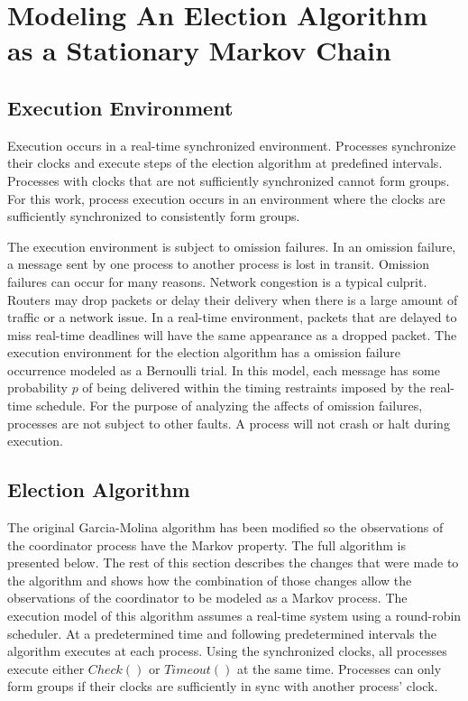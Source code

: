 \section{Modeling An Election Algorithm as a Stationary Markov Chain}



\subsection{Execution Environment}

Execution occurs in a real-time synchronized environment.
Processes synchronize their clocks and execute steps of the election algorithm at predefined intervals.
Processes with clocks that are not sufficiently synchronized cannot form groups.
For this work, process execution occurs in an environment where the clocks are sufficiently synchronized to consistently form groups.

The execution environment is subject to omission failures.
In an omission failure, a message sent by one process to another process is lost in transit.
Omission failures can occur for many reasons.
Network congestion is a typical culprit.
Routers may drop packets or delay their delivery when there is a large amount of traffic or a network issue.
In a real-time environment, packets that are delayed to miss real-time deadlines will have the same appearance as a dropped packet.
The execution environment for the election algorithm has a omission failure occurrence modeled as a Bernoulli trial.
In this model, each message has some probability $p$ of being delivered within the timing restraints imposed by the real-time schedule.
For the purpose of analyzing the affects of omission failures, processes are not subject to other faults.
A process will not crash or halt during execution.

\subsection{Election Algorithm}

The original Garcia-Molina algorithm has been modified so the observations of the coordinator process have the Markov property.
The full algorithm is presented below.
The rest of this section describes the changes that were made to the algorithm and shows how the combination of those changes allow the observations of the coordinator to be modeled as a Markov process.
The execution model of this algorithm assumes a real-time system using a round-robin scheduler.
At a predetermined time and following predetermined intervals the algorithm executes at each process.
Using the synchronized clocks, all processes execute either $Check()$ or $Timeout()$ at the same time.
Processes can only form groups if their clocks are sufficiently in sync with another process' clock.

